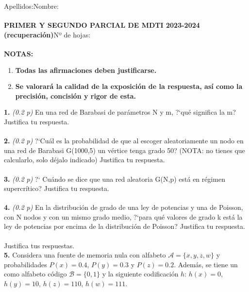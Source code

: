 \documentclass{article}
\title{\vspace{-6cm}}
\date{}
\begin{document}
\maketitle
Apellidos:\hspace{11cm}Nombre:\\\\
\hspace*{4cm}\textbf{PRIMER Y SEGUNDO PARCIAL DE MDTI 2023-2024 (recuperación)}\hspace*{0.5cm}Nº de hojas:\\\\

\textbf{NOTAS:}
\begin{enumerate}
    \item\textbf{Todas las afirmaciones deben justificarse.}
    \item\textbf{Se valorará la calidad de la exposición de la respuesta, así como la precisión, concisión y rigor de esta.}
\end{enumerate}

\vspace{0.2cm}

\textbf{1.} \textit{(0.2 p)}  En  una red de Barabasi de parámetros N y m, ?`qué significa la m? Justifica tu respuesta.\\\\
\textbf{2.} \textit{(0.2 p)} ?`Cuál es la probabilidad de que al escoger aleatoriamente un nodo en una red de Barabasi G(1000,5) un vértice tenga grado 50? (NOTA: no tienes que calcularlo, solo déjalo indicado) Justifica tu respuesta.\\\\
\textbf{3.} \textit{(0.2 p)} ?` Cuándo se dice que una red aleatoria G(N,p) está en régimen supercrítico? Justifica tu respuesta.\\\\
\textbf{4.} \textit{(0.2 p)}  En la distribución de grado de una ley de potencias y una de Poisson, con N nodos y con un mismo grado medio, ?`para qué valores de grado k está la ley de potencias por encima de la  distribución de Poisson? Justifica tu respuesta.\\\\

Justifica tus respuestas.\\

\textbf{5.} Considera una fuente de memoria nula con alfabeto \(\mathcal{A} = \{x, y, z, w\}\) y probabilidades \(P(x) = 0.4\), \(P(y) = 0.3\) y \(P(z) = 0.2\). Además, se tiene un como alfabeto código \(\mathcal{B} = \{0, 1\}\) y la siguiente codificación \(h\): \(h(x) = 0\), \(h(y) = 10\), \(h(z) = 110\), \(h(w) = 111\).
\end{document}
